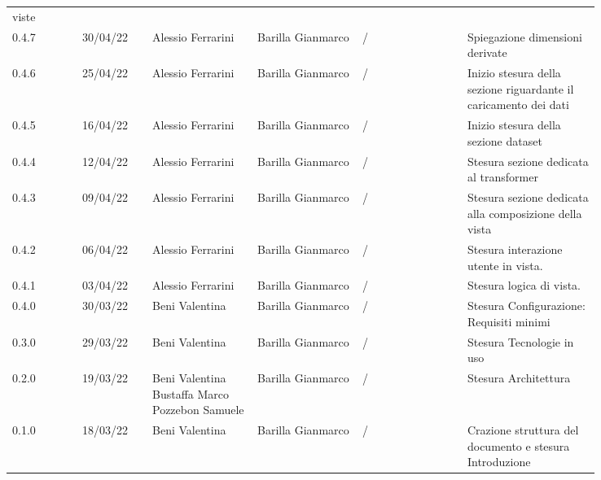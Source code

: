 {\begin{tabular}{p{0.10\linewidth}p{0.10\linewidth}p{0.15\linewidth}p{0.15\linewidth}p{0.15\linewidth}p{0.19\linewidth}}
  viste \\
	\rowcolor[RGB]{216, 235, 171}
	0.4.7 & 30/04/22 & Alessio Ferrarini & Barilla Gianmarco & / & Spiegazione dimensioni derivate
  \\
	\rowcolor[RGB]{233, 245, 206}
	0.4.6 & 25/04/22 & Alessio Ferrarini & Barilla Gianmarco & / & Inizio stesura della sezione
  riguardante il caricamento dei dati \\
	\rowcolor[RGB]{216, 235, 171}
	0.4.5 & 16/04/22 & Alessio Ferrarini & Barilla Gianmarco & / & Inizio stesura della sezione
  dataset \\
	\rowcolor[RGB]{233, 245, 206}
	0.4.4 & 12/04/22 & Alessio Ferrarini & Barilla Gianmarco & / & Stesura sezione dedicata al
  transformer \\
	\rowcolor[RGB]{216, 235, 171}
	0.4.3 & 09/04/22 & Alessio Ferrarini & Barilla Gianmarco & / & Stesura sezione dedicata alla
  composizione della vista \\
	\rowcolor[RGB]{233, 245, 206}
	0.4.2 & 06/04/22 & Alessio Ferrarini & Barilla Gianmarco & / & Stesura interazione utente in
  vista. \\
	\rowcolor[RGB]{216, 235, 171}
	0.4.1 & 03/04/22 & Alessio Ferrarini & Barilla Gianmarco & / & Stesura logica di vista. \\
	\rowcolor[RGB]{233, 245, 206}
	0.4.0 & 30/03/22 & Beni Valentina & Barilla Gianmarco & / & Stesura Configurazione: Requisiti minimi\\
	\rowcolor[RGB]{216, 235, 171}
	0.3.0 & 29/03/22 & Beni Valentina & Barilla Gianmarco & / & Stesura Tecnologie in uso\\
	\rowcolor[RGB]{233, 245, 206}
	0.2.0 & 19/03/22 & Beni Valentina Bustaffa Marco Pozzebon Samuele & Barilla Gianmarco & / & Stesura Architettura\\
	\rowcolor[RGB]{216, 235, 171}
	0.1.0 & 18/03/22 & Beni Valentina & Barilla Gianmarco & / & Crazione struttura del documento e stesura Introduzione\\
\end{tabular}
}
